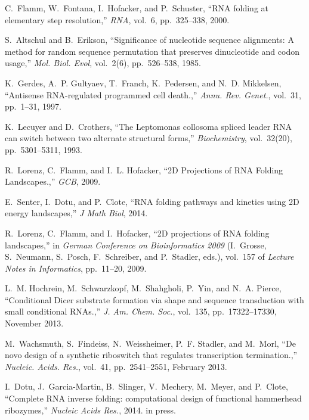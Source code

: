 \documentclass[11pt, oneside]{Thesis} %
\begin{document}
\begin{thebibliography}{100}
C.~Flamm, W.~Fontana, I.~Hofacker, and P.~Schuster, ``{RNA} folding at
  elementary step resolution,'' {\em RNA}, vol.~6, pp.~325--338, 2000.

S.~Altschul and B.~Erikson, ``Significance of nucleotide sequence alignments:
  {A} method for random sequence permutation that preserves dinucleotide and
  codon usage,'' {\em Mol. Biol. Evol}, vol.~2(6), pp.~526--538, 1985.

K.~Gerdes, A.~P. Gultyaev, T.~Franch, K.~Pedersen, and N.~D. Mikkelsen,
  ``Antisense {RNA}-regulated programmed cell death.,'' {\em Annu. Rev.
  Genet.}, vol.~31, pp.~1--31, 1997.

K.~Lecuyer and D.~Crothers, ``The {L}eptomonas collosoma spliced leader {RNA}
  can switch between two alternate structural forms,'' {\em Biochemistry},
  vol.~32(20), pp.~5301--5311, 1993.

R.~Lorenz, C.~Flamm, and I.~L. Hofacker, ``{2D Projections of RNA Folding
  Landscapes.},'' {\em GCB}, 2009.

E.~Senter, I.~Dotu, and P.~Clote, ``{RNA} folding pathways and kinetics using
  {2D} energy landscapes,'' {\em J Math Biol}, 2014.

R.~Lorenz, C.~Flamm, and I.~Hofacker, ``2{D} projections of {RNA} folding
  landscapes,'' in {\em German Conference on Bioinformatics 2009} (I.~Grosse,
  S.~Neumann, S.~Posch, F.~Schreiber, and P.~Stadler, eds.), vol.~157 of {\em
  Lecture Notes in Informatics}, pp.~11--20, 2009.

L.~M. Hochrein, M.~Schwarzkopf, M.~Shahgholi, P.~Yin, and N.~A. Pierce,
  ``Conditional {Dicer} substrate formation via shape and sequence transduction
  with small conditional {RNAs}.,'' {\em J. Am. Chem. Soc.}, vol.~135,
  pp.~17322--17330, November 2013.

M.~Wachsmuth, S.~Findeiss, N.~Weissheimer, P.~F. Stadler, and M.~Morl, ``De
  novo design of a synthetic riboswitch that regulates transcription
  termination.,'' {\em Nucleic. Acids. Res.}, vol.~41, pp.~2541--2551, February
  2013.

I.~Dotu, J.~Garcia-Martin, B.~Slinger, V.~Mechery, M.~Meyer, and P.~Clote,
  ``Complete {RNA} inverse folding: computational design of functional
  hammerhead ribozymes,'' {\em Nucleic Acids Res.}, 2014.
\newblock in press.


\end{thebibliography}
\end{document}
